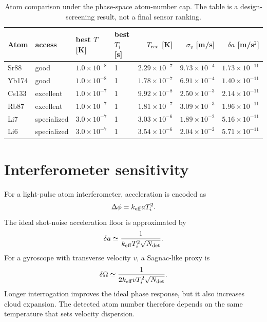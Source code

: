 \documentclass[11pt,a4paper]{article}
\begin{document}
\begin{table}[h]
\centering
\small
\begin{tabular}{llllrrr}
\toprule
Atom & access & best $T$ [K] & best $T_i$ [s] & $T_{\rm rec}$ [K] & $\sigma_v$ [m/s] & $\delta a$ [m/s$^2$]\\
\midrule
Sr88 & good & $1.0\times10^{-8}$ & 1 & $2.29\times10^{-7}$ & $9.73\times10^{-4}$ & $1.73\times10^{-11}$\\
Yb174 & good & $1.0\times10^{-8}$ & 1 & $1.78\times10^{-7}$ & $6.91\times10^{-4}$ & $1.40\times10^{-11}$\\
Cs133 & excellent & $1.0\times10^{-7}$ & 1 & $9.92\times10^{-8}$ & $2.50\times10^{-3}$ & $2.14\times10^{-11}$\\
Rb87 & excellent & $1.0\times10^{-7}$ & 1 & $1.81\times10^{-7}$ & $3.09\times10^{-3}$ & $1.96\times10^{-11}$\\
Li7 & specialized & $3.0\times10^{-7}$ & 1 & $3.03\times10^{-6}$ & $1.89\times10^{-2}$ & $5.16\times10^{-11}$\\
Li6 & specialized & $3.0\times10^{-7}$ & 1 & $3.54\times10^{-6}$ & $2.04\times10^{-2}$ & $5.71\times10^{-11}$\\
\bottomrule
\end{tabular}
\caption{Atom comparison under the phase-space atom-number cap. The table is a
design-screening result, not a final sensor ranking.}
\end{table}

\section{Interferometer sensitivity}

For a light-pulse atom interferometer, acceleration is encoded as
\begin{equation}
\Delta\phi=k_{\rm eff}aT_i^2.
\end{equation}
The ideal shot-noise acceleration floor is approximated by
\begin{equation}
\delta a\simeq
\frac{1}{k_{\rm eff}T_i^2\sqrt{N_{\rm det}}}.
\end{equation}
For a gyroscope with transverse velocity $v$, a Sagnac-like proxy is
\begin{equation}
\delta\Omega\simeq
\frac{1}{2k_{\rm eff}vT_i^2\sqrt{N_{\rm det}}}.
\end{equation}
Longer interrogation improves the ideal phase response, but it also increases
cloud expansion. The detected atom number therefore depends on the same
temperature that sets velocity dispersion.
\end{document}
